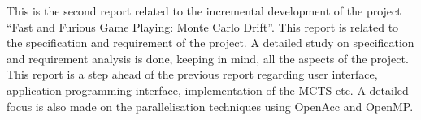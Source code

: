 This is the second report related to the incremental development of the project “Fast and Furious Game Playing: Monte Carlo Drift”. This report is related to the specification and requirement of the project.
A detailed study on specification and requirement analysis is done, keeping in mind, all the aspects of the project. This report is a step ahead of the previous report regarding user interface, application programming interface, implementation of the MCTS etc. A detailed focus is also made on the parallelisation techniques using OpenAcc and OpenMP.